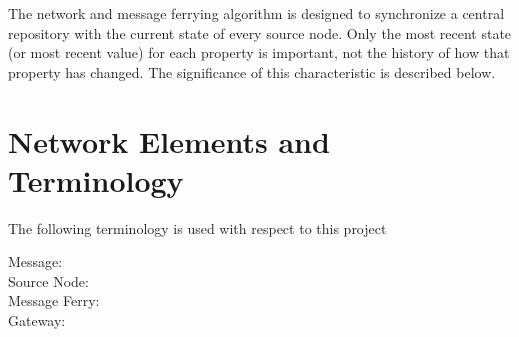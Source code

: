 The network and message ferrying algorithm is designed to synchronize a central repository with the current state of every source node.
Only the most recent state (or most recent value) for each property is important, not the history of how that property has changed. 
The significance of this characteristic is described below. %

\section{Network Elements and Terminology}

The following terminology is used with respect to this project

\begin{description}
\item[Message: ]
\item[Source Node: ]
\item[Message Ferry: ]
\item[Gateway: ]
\end{description}